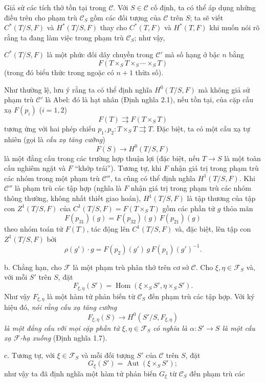 Giả sử các tích thớ tồn tại trong $\mathcal C$. Với $S\in\mathcal C$ cố định,
ta có thể áp dụng những điều trên cho phạm trù $\mathcal C_S$ gồm các đối tượng
của $\mathcal C$ trên $S$; ta sẽ viết $C^*(T/S,F)$ và $H^*(T/S,F)$ thay cho
$C^*(T,F)$ và $H^*(T,F)$ khi muốn nói rõ rằng ta đang làm việc trong phạm trù
$\mathcal C_S$; như vậy,

$C^*(T/S,F)$ là một phức đối dây chuyền trong $\mathcal C'$ mà số hạng ở bậc
$n$ bằng
\[
  F(T\times_ST\times_S\cdots\times_ST)
\]
(trong đó biểu thức trong ngoặc có $n+1$ thừa số).

Như thường lệ, lưu ý rằng ta có thể định nghĩa $H^0(T/S,F)$ mà không giả sử
phạm trù $\mathcal C'$ là Abel: đó là hạt nhân (Định nghĩa 2.1), nếu tồn tại,
của cặp cấu xạ $F(p_i)$ ($i=1,2$)
\[
  F(T)\rightrightarrows F(T\times_ST)
\]
tương ứng với hai phép chiếu
$p_1,p_2:T\times_ST\rightrightarrows T$. Đặc biệt, ta có một cấu xạ tự nhiên
(gọi là \emph{cấu xạ tăng cường})
\[
  F(S)\longrightarrow H^0(T/S,F)
\]
là một đẳng cấu trong các trường hợp thuận lợi (đặc biệt, nếu
$T\longrightarrow S$ là một toàn cấu nghiêm ngặt và $F$ “khớp trái”).
Tương tự, khi $F$ nhận giá trị trong phạm trù các nhóm trong một phạm trù
$\mathcal C''$, ta cũng có thể định nghĩa $H^1(T/S,F)$. Khi $\mathcal C''$ là
phạm trù các tập hợp (nghĩa là $F$ nhận giá trị trong phạm trù các nhóm thông
thường, không nhất thiết giao hoán), $H^1(T/S,F)$ là tập thương của tập con
$Z^1(T/S,F)$ của $C^1(T/S,F)=F(T\times_ST)$ gồm các phần tử $g$ thỏa mãn
\[
  F(p_{31})(g)=F(p_{32})(g)\,F(p_{21})(g)
\]
theo nhóm toán tử $F(T)$, tác động lên $C^1(T/S,F)$ và, đặc biệt, lên tập con
$Z^1(T/S,F)$ bởi
\[
  \rho(g')\cdot g=F(p_2)(g')\,g\,F(p_1)(g')^{-1}.
\]

\medskip\noindent
b. Chẳng hạn, cho $\mathcal F$ là một phạm trù phân thớ trên cơ sở
$\mathcal C$. Cho $\xi,\eta\in\mathcal F_S$ và, với mỗi $S'$ trên $S$, đặt
\[
  F_{\xi,\eta}(S')=
  \operatorname{Hom}(\xi\times_SS',\eta\times_SS').
\]
Như vậy $F_{\xi,\eta}$ là một hàm tử phản biến từ $\mathcal C_S$ đến phạm trù
các tập hợp. Với ký hiệu đó, \emph{nói rằng cấu xạ tăng cường}
\[
  F_{\xi,\eta}(S)\longrightarrow H^0(S'/S,F_{\xi,\eta})
\]
\emph{là một đẳng cấu với mọi cặp phần tử
$\xi,\eta\in\mathcal F_S$ có nghĩa là
$\alpha:S'\longrightarrow S$ là một cấu xạ $\mathcal F$-hạ xuống}
(Định nghĩa 1.7).

\medskip\noindent
c. Tương tự, với $\xi\in\mathcal F_S$ và mỗi đối tượng $S'$ của $\mathcal C$
trên $S$, đặt
\[
  G_\xi(S')=\operatorname{Aut}(\xi\times_SS') ;
\]
như vậy ta đã định nghĩa một hàm tử phản biến $G_\xi$ từ $\mathcal C_S$ đến
phạm trù các

